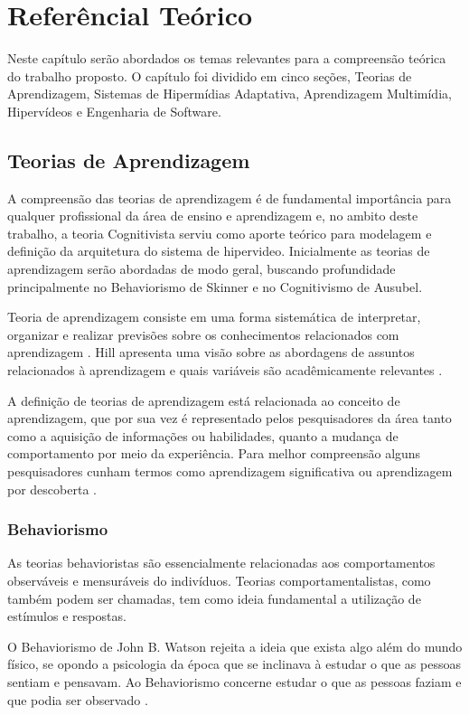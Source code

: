 \chapter[Referêncial Teórico]{Referêncial Teórico}

Neste capítulo serão abordados os temas relevantes para a compreensão teórica do trabalho proposto. O capítulo foi dividido em cinco seções, Teorias de Aprendizagem, Sistemas de Hipermídias Adaptativa, Aprendizagem Multimídia, Hipervídeos e Engenharia de Software.

\section{Teorias de Aprendizagem}

A compreensão das teorias de aprendizagem é de fundamental importância para qualquer profissional da área de ensino e aprendizagem e, no ambito deste trabalho, a teoria Cognitivista serviu como aporte teórico para modelagem e definição da arquitetura do sistema de hipervideo. Inicialmente as teorias de aprendizagem serão abordadas de modo geral, buscando profundidade principalmente no Behaviorismo de Skinner e no Cognitivismo de Ausubel.

Teoria de aprendizagem consiste em uma forma sistemática de interpretar, organizar e realizar previsões sobre os conhecimentos relacionados com aprendizagem \cite{moreira1999}.
Hill apresenta uma visão sobre as abordagens de assuntos relacionados à aprendizagem e quais variáveis são acadêmicamente relevantes \cite{hill2002}.

A definição de teorias de aprendizagem está relacionada ao conceito de aprendizagem, que por sua vez é representado pelos pesquisadores da área tanto como a aquisição de informações ou habilidades, quanto a mudança de comportamento por meio da experiência. Para melhor compreensão alguns pesquisadores cunham termos como aprendizagem significativa ou aprendizagem por descoberta \cite{fragelli2010}.

\subsection{Behaviorismo}

As teorias behavioristas são essencialmente relacionadas aos comportamentos observáveis e mensuráveis do indivíduos. Teorias comportamentalistas, como também podem ser chamadas, tem como ideia fundamental a utilização de estímulos e respostas.

O Behaviorismo de John B. Watson rejeita a ideia que exista algo além do mundo físico, se opondo a psicologia da época que se inclinava à estudar o que as pessoas sentiam e pensavam. Ao Behaviorismo concerne estudar o que as pessoas faziam e que podia ser observado \cite{moreira1999}.

